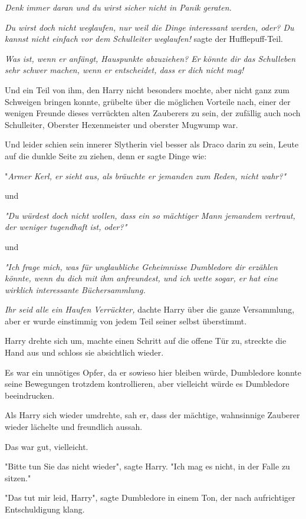 {\emph{Denk immer daran und du wirst sicher nicht in Panik geraten.}

\emph{Du wirst doch nicht weglaufen, nur weil die Dinge interessant werden, oder? Du kannst nicht einfach vor dem Schulleiter weglaufen!} sagte der Hufflepuff-Teil.

\emph{Was ist, wenn er anfängt, Hauspunkte abzuziehen? Er könnte dir das Schulleben sehr schwer machen, wenn er entscheidet, dass er dich nicht mag!}

Und ein Teil von ihm, den Harry nicht besonders mochte, aber nicht ganz zum Schweigen bringen konnte, grübelte über die möglichen Vorteile nach, einer der wenigen Freunde dieses verrückten alten Zauberers zu sein, der zufällig auch noch Schulleiter, Oberster Hexenmeister und oberster Mugwump war.

Und leider schien sein innerer Slytherin viel besser als Draco darin zu sein, Leute auf die dunkle Seite zu ziehen, denn er sagte Dinge wie:

"\emph{Armer Kerl, er sieht aus, als bräuchte er jemanden zum Reden, nicht wahr?"}

und

\emph{"Du würdest doch nicht wollen, dass ein so mächtiger Mann jemandem vertraut, der weniger tugendhaft ist, oder?"}

und

\emph{"Ich frage mich, was für unglaubliche Geheimnisse Dumbledore dir erzählen könnte, wenn du dich mit ihm anfreundest, und ich wette sogar, er hat eine wirklich interessante Büchersammlung.}

\emph{Ihr seid alle ein Haufen Verrückter,} dachte Harry über die ganze Versammlung, aber er wurde einstimmig von jedem Teil seiner selbst überstimmt.

Harry drehte sich um, machte einen Schritt auf die offene Tür zu, streckte die Hand aus und schloss sie absichtlich wieder.

Es war ein unnötiges Opfer, da er sowieso hier bleiben würde, Dumbledore konnte seine Bewegungen trotzdem kontrollieren, aber vielleicht würde es Dumbledore beeindrucken.

Als Harry sich wieder umdrehte, sah er, dass der mächtige, wahnsinnige Zauberer wieder lächelte und freundlich aussah.

Das war gut, vielleicht.

"Bitte tun Sie das nicht wieder", sagte Harry. "Ich mag es nicht, in der Falle zu sitzen."

"Das tut mir leid, Harry", sagte Dumbledore in einem Ton, der nach aufrichtiger Entschuldigung klang.

}
